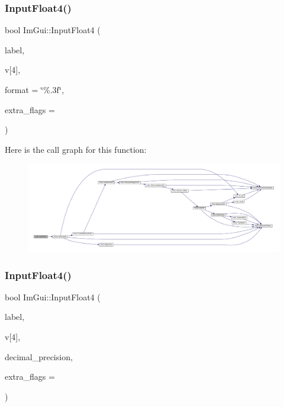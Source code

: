 \subsubsection{\texorpdfstring{Input\+Float4()}{InputFloat4()}\hspace{0.1cm}{\footnotesize\ttfamily [1/2]}}
{\footnotesize\ttfamily bool Im\+Gui\+::\+Input\+Float4 (\begin{DoxyParamCaption}\item[{const char $\ast$}]{label,  }\item[{float}]{v\mbox{[}4\mbox{]},  }\item[{const char $\ast$}]{format = {\ttfamily \char`\"{}\%.3f\char`\"{}},  }\item[{\mbox{\hyperlink{imgui_8h_a7d2c6153a6b9b5d3178ce82434ac9fb8}{Im\+Gui\+Input\+Text\+Flags}}}]{extra\+\_\+flags = {} }\end{DoxyParamCaption})}

Here is the call graph for this function\+:
\nopagebreak
\begin{figure}[H]
\begin{center}
\leavevmode
\includegraphics[width=350pt]{namespace_im_gui_a2e45de8550d78834f6c9a0a16db4c38c_cgraph}
\end{center}
\end{figure}
\mbox{\label{namespace_im_gui_aba9f9d8922403f96ca246c65e4929198}} 
\subsubsection{\texorpdfstring{Input\+Float4()}{InputFloat4()}\hspace{0.1cm}{\footnotesize\ttfamily [2/2]}}
{\footnotesize\ttfamily bool Im\+Gui\+::\+Input\+Float4 (\begin{DoxyParamCaption}\item[{const char $\ast$}]{label,  }\item[{float}]{v\mbox{[}4\mbox{]},  }\item[{int}]{decimal\+\_\+precision,  }\item[{\mbox{\hyperlink{imgui_8h_a7d2c6153a6b9b5d3178ce82434ac9fb8}{Im\+Gui\+Input\+Text\+Flags}}}]{extra\+\_\+flags = {} }\end{DoxyParamCaption})}

